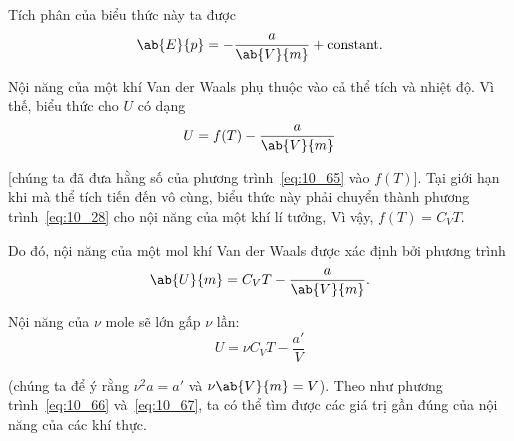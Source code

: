 \noindent

Tích phân của biểu thức này ta được
\begin{equation}\label{eq:10_65}
	\ab{E}{p} = -\frac{a}{\ab{V}{m}} + \text{constant}.
\end{equation}


Nội năng của một khí Van der Waals phụ thuộc vào cả thể tích và nhiệt độ. Vì thế, biểu thức cho $U$ có dạng  
\begin{equation*}
	U = f(T) - \frac{a}{\ab{V}{m}}
\end{equation*}

\noindent

[chúng ta đã đưa hằng số của phương trình~\eqref{eq:10_65} vào $f(T)$]. Tại giới hạn khi mà thể tích tiến đến vô cùng, biểu thức này phải chuyển thành phương trình~\eqref{eq:10_28} cho nội năng của một khí lí tưởng, Vì vậy, $f(T)=C_VT$. 


Do đó, nội năng của một mol khí Van der Waals được xác định bởi phương trình 
\begin{equation}\label{eq:10_66}
	\ab{U}{m} = C_VT - \frac{a}{\ab{V}{m}}.
\end{equation}

\noindent

Nội năng của $\nu$ mole sẽ lớn gấp $\nu$ lần: 
\begin{equation}\label{eq:10_67}
	U = \nu C_VT - \frac{a'}{V}
\end{equation}

\noindent

(chúng ta để ý rằng $\nu^2a=a'$ và $\nu\ab{V}{m}=V$). Theo như phương trình~\eqref{eq:10_66} và~\eqref{eq:10_67}, ta có thể tìm được các giá trị gần đúng của nội năng của các khí thực. 

